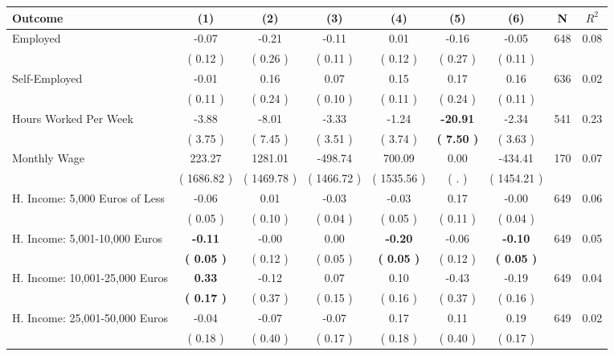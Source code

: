 \begin{tabular}{lcccccccc}
\toprule
 \textbf{Outcome} & \textbf{(1)} & \textbf{(2)} & \textbf{(3)} & \textbf{(4)} & \textbf{(5)} & \textbf{(6)} & \textbf{N} & \textbf{$ R^2$} \\
\midrule
Employed &     -0.07 &     -0.21 &     -0.11 &      0.01 &     -0.16 &     -0.05 & 648 &       0.08 \\ 
 & (     0.12 ) & (     0.26 ) & (     0.11 ) & (     0.12 ) & (     0.27 ) & (     0.11 ) & \\
Self-Employed &     -0.01 &      0.16 &      0.07 &      0.15 &      0.17 &      0.16 & 636 &       0.02 \\ 
 & (     0.11 ) & (     0.24 ) & (     0.10 ) & (     0.11 ) & (     0.24 ) & (     0.11 ) & \\
Hours Worked Per Week &     -3.88 &     -8.01 &     -3.33 &     -1.24 & \textbf{   -20.91} &     -2.34 & 541 &       0.23 \\ 
 & (     3.75 ) & (     7.45 ) & (     3.51 ) & (     3.74 ) & \textbf{(     7.50 )} & (     3.63 ) & \\
Monthly Wage &    223.27 &   1281.01 &   -498.74 &    700.09 &      0.00 &   -434.41 & 170 &       0.07 \\ 
 & (  1686.82 ) & (  1469.78 ) & (  1466.72 ) & (  1535.56 ) & (        . ) & (  1454.21 ) & \\
H. Income: 5,000 Euros of Less &     -0.06 &      0.01 &     -0.03 &     -0.03 &      0.17 &     -0.00 & 649 &       0.06 \\ 
 & (     0.05 ) & (     0.10 ) & (     0.04 ) & (     0.05 ) & (     0.11 ) & (     0.04 ) & \\
H. Income: 5,001-10,000 Euros & \textbf{    -0.11} &     -0.00 &      0.00 & \textbf{    -0.20} &     -0.06 & \textbf{    -0.10} & 649 &       0.05 \\ 
 & \textbf{(     0.05 )} & (     0.12 ) & (     0.05 ) & \textbf{(     0.05 )} & (     0.12 ) & \textbf{(     0.05 )} & \\
H. Income: 10,001-25,000 Euros & \textbf{     0.33} &     -0.12 &      0.07 &      0.10 &     -0.43 &     -0.19 & 649 &       0.04 \\ 
 & \textbf{(     0.17 )} & (     0.37 ) & (     0.15 ) & (     0.16 ) & (     0.37 ) & (     0.16 ) & \\
H. Income: 25,001-50,000 Euros &     -0.04 &     -0.07 &     -0.07 &      0.17 &      0.11 &      0.19 & 649 &       0.02 \\ 
 & (     0.18 ) & (     0.40 ) & (     0.17 ) & (     0.18 ) & (     0.40 ) & (     0.17 ) & \\

\end{tabular}
